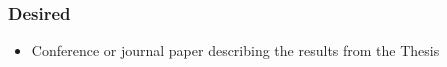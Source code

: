 \documentclass[thesis]{mas_proposal}
\begin{document}
\subsubsection*{Desired}
\begin{itemize}
    \item  Conference or journal paper describing the results from the Thesis
\end{itemize}


\nocite{*}

\end{document}
